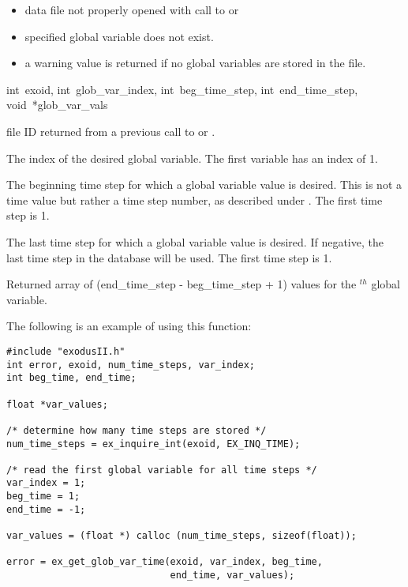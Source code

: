 \begin{itemize}
 \item data file not properly opened with call to  
or 

 \item specified global variable does not exist.

 \item a warning value is returned if no global variables 
are stored in the file.
\end{itemize}


{int~exoid, 
int~glob_var_index, 
int~beg_time_step,
int~end_time_step, 
void~*glob_var_vals}

\begin{parameters}
\item[{int exoid \R{}}]
\exo{} file ID returned from a previous call to  
or .

\item[{int glob_var_index \R{}}]
The index of the desired global variable. The first variable 
has an index of 1.

\item[{int beg_time_step \R{}}]
The beginning time step for which a global variable value is
desired. This is not a time value but rather a time step number, as
described under . The first time step is 1.

\item[{int end_time_step \R{}}]
The last time step for which a global variable value is desired. If
negative, the last time step in the database will be used. The first
time step is 1.

\item[{void* glob_var_vals \W{}}]
Returned array of (end_time_step - beg_time_step + 
1) values for the $^{th}$ global variable.
\end{parameters}

The following is an example of using this function:

\begin{lstlisting}
#include "exodusII.h"
int error, exoid, num_time_steps, var_index;
int beg_time, end_time;

float *var_values;

/* determine how many time steps are stored */
num_time_steps = ex_inquire_int(exoid, EX_INQ_TIME);

/* read the first global variable for all time steps */
var_index = 1;
beg_time = 1;
end_time = -1;

var_values = (float *) calloc (num_time_steps, sizeof(float));

error = ex_get_glob_var_time(exoid, var_index, beg_time, 
                             end_time, var_values);
\end{lstlisting}


